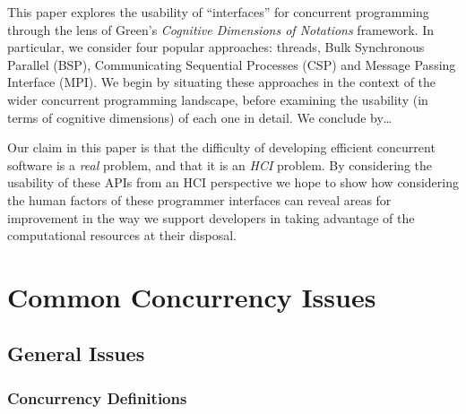 \documentclass{sig-alternate}
\begin{document}
This paper explores the usability of ``interfaces'' for concurrent
programming through the lens of Green's \emph{Cognitive Dimensions of
  Notations} framework\cite{green89:_cognit_dimen_notat}. In
particular, we consider four popular approaches:
threads, Bulk Synchronous Parallel (BSP), Communicating Sequential
Processes (CSP) and Message Passing Interface (MPI).  We begin by
situating these approaches in the context of the wider concurrent
programming landscape, before examining the usability (in terms of
cognitive dimensions) of each one in detail. We conclude by\ldots

Our claim in this paper is that the difficulty of developing efficient
concurrent software is a \emph{real} problem, and that it is an
\emph{HCI} problem. By considering the usability of these APIs from an
HCI perspective we hope to show how considering the human factors of
these programmer interfaces can reveal areas for improvement in the
way we support developers in taking advantage of the computational
resources at their disposal.



\section{Common Concurrency Issues}
\subsection{General Issues}
\subsubsection{Concurrency Definitions}
\end{document}

